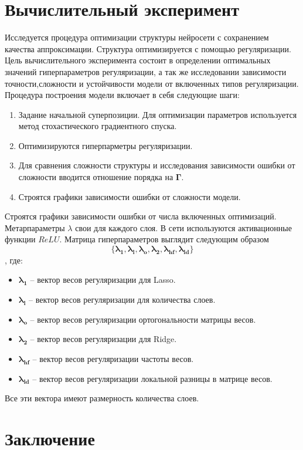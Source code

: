 \documentclass[12pt, twoside]{article}
\begin{document}
\section{Вычислительный эксперимент}
Исследуется процедура оптимизации структуры нейросети с сохранением качества аппроксимации. Структура оптимизируется с помощью регуляризации. Цель вычислительного эксперимента состоит в определении оптимальных значений гиперпараметров регуляризации, а так же исследовании зависимости точности,сложности и устойчивости модели от включенных типов регуляризации. Процедура построения модели включает в себя \mbox{следующие} шаги:
\begin{enumerate}
\item
Задание начальной суперпозиции. Для оптимизации параметров используется метод стохастического градиентного спуска.
\item
Оптимизируются гиперпарметры регуляризации.
\item
Для сравнения сложности структуры и исследования зависимости ошибки от сложности вводится отношение порядка на $\mathbf{\Gamma}$.
\item
Строятся графики зависимости ошибки от сложности модели.
\end{enumerate}


Строятся графики зависимости ошибки от числа включенных оптимизаций. Метарпараметры $\lambda$ свои для каждого слоя.
В сети используются активационные функции $ReLU$. Матрица гиперпараметров выглядит следующим образом
\[\{\mathbf{\lambda_1}, \mathbf{\lambda_l}, \mathbf{\lambda_o}, \mathbf{\lambda_2}, \mathbf{\lambda_{hf}}, \mathbf{\lambda_{ld}}\}\],
где:
\begin{itemize}
    \item 
    $\mathbf{\lambda_1}$ -- вектор весов регуляризации для Lasso.
    \item
    $\mathbf{\lambda_l}$ -- вектор весов регуляризации для количества слоев.
    \item
    $\mathbf{\lambda_o}$ -- вектор весов регуляризации ортогональности матрицы весов.
    \item
    $ \mathbf{\lambda_2}$ -- вектор весов регуляризации для Ridge.
    \item
    $\mathbf{\lambda_{hf}}$  -- вектор весов регуляризации частоты весов.
    \item
     $ \mathbf{\lambda_{ld}}$ -- вектор весов регуляризации локальной разницы в матрице весов.
\end{itemize}
Все эти вектора имеют размерность количества слоев.
\section{Заключение}
\end{document}
